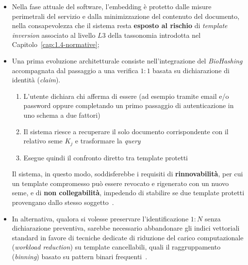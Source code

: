 \begin{itemize}
    \item Nella fase attuale del software, l'embedding è protetto dalle misure perimetrali del servizio e dalla minimizzazione del contenuto del documento, nella consapevolezza che il sistema resta \textbf{esposto al rischio} di \textit{template inversion} associato al livello $L3$ della tassonomia introdotta nel Capitolo~\ref{cap:1.4-normative};
    \item Una prima evoluzione architetturale consiste nell'integrazione del \textit{BioHashing} accompagnata dal passaggio a una verifica $1:1$ basata su dichiarazione di identità (\textit{claim}).~\begin{enumerate}
        \item L'utente dichiara chi afferma di essere (ad esempio tramite email e/o password oppure completando un primo passaggio di autenticazione in uno schema a due fattori)
        \item Il sistema riesce a recuperare il solo documento corrispondente con il relativo seme $K_j$ e trasformare la \textit{query}
        \item Esegue quindi il confronto diretto tra template protetti
        \end{enumerate} 
        Il sistema, in questo modo, soddisferebbe i requisiti di \textbf{rinnovabilità}, per cui un template compromesso può essere revocato e rigenerato con un nuovo seme, e di \textbf{non collegabilità}, impedendo di stabilire se due template protetti provengano dallo stesso soggetto~\cite{otroshishahrezaBenchmarkingCancelableBiometrics2022}. 
        \item In alternativa, qualora si volesse preservare l'identificazione $1:N$ senza dichiarazione preventiva, sarebbe necessario abbandonare gli indici vettoriali standard in favore di tecniche dedicate di riduzione del carico computazionale (\textit{workload reduction}) su template cancellabili, quali il raggruppamento (\textit{binning}) basato su pattern binari frequenti~\cite{osorio-roigPrivacypreservingMultibiometricIndexing2023}.
\end{itemize}

